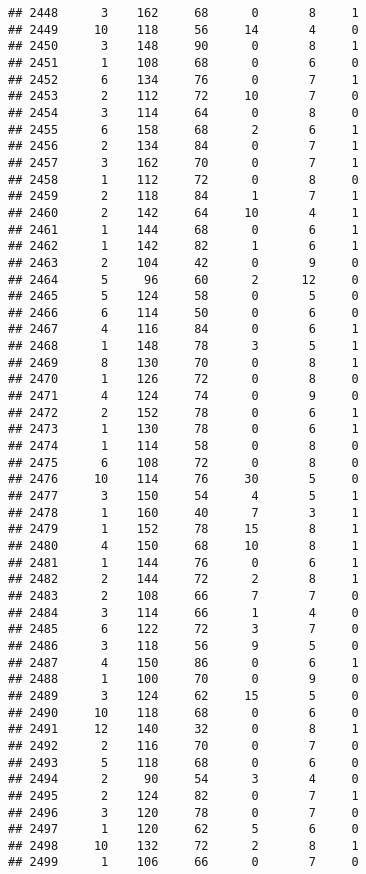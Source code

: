 \documentclass[
]{article}
\begin{document}
\begin{verbatim}
## 2448      3    162     68      0       8     1
## 2449     10    118     56     14       4     0
## 2450      3    148     90      0       8     1
## 2451      1    108     68      0       6     0
## 2452      6    134     76      0       7     1
## 2453      2    112     72     10       7     0
## 2454      3    114     64      0       8     0
## 2455      6    158     68      2       6     1
## 2456      2    134     84      0       7     1
## 2457      3    162     70      0       7     1
## 2458      1    112     72      0       8     0
## 2459      2    118     84      1       7     1
## 2460      2    142     64     10       4     1
## 2461      1    144     68      0       6     1
## 2462      1    142     82      1       6     1
## 2463      2    104     42      0       9     0
## 2464      5     96     60      2      12     0
## 2465      5    124     58      0       5     0
## 2466      6    114     50      0       6     0
## 2467      4    116     84      0       6     1
## 2468      1    148     78      3       5     1
## 2469      8    130     70      0       8     1
## 2470      1    126     72      0       8     0
## 2471      4    124     74      0       9     0
## 2472      2    152     78      0       6     1
## 2473      1    130     78      0       6     1
## 2474      1    114     58      0       8     0
## 2475      6    108     72      0       8     0
## 2476     10    114     76     30       5     0
## 2477      3    150     54      4       5     1
## 2478      1    160     40      7       3     1
## 2479      1    152     78     15       8     1
## 2480      4    150     68     10       8     1
## 2481      1    144     76      0       6     1
## 2482      2    144     72      2       8     1
## 2483      2    108     66      7       7     0
## 2484      3    114     66      1       4     0
## 2485      6    122     72      3       7     0
## 2486      3    118     56      9       5     0
## 2487      4    150     86      0       6     1
## 2488      1    100     70      0       9     0
## 2489      3    124     62     15       5     0
## 2490     10    118     68      0       6     0
## 2491     12    140     32      0       8     1
## 2492      2    116     70      0       7     0
## 2493      5    118     68      0       6     0
## 2494      2     90     54      3       4     0
## 2495      2    124     82      0       7     1
## 2496      3    120     78      0       7     0
## 2497      1    120     62      5       6     0
## 2498     10    132     72      2       8     1
## 2499      1    106     66      0       7     0

\end{verbatim}
\end{document}
